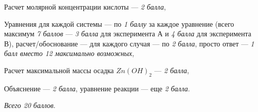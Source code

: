 \additionalCriteria

Расчет молярной концентрации кислоты — \textit{2 балла},

Уравнения для каждой системы — по \textit{1 баллу} за каждое уравнение (всего максимум \textit{7 баллов} — \textit{3 балла} для эксперимента А и \textit{4 балла} для эксперимента В), расчет/обоснование — для каждого случая — по \textit{2 балла}, просто ответ — \textit{1 балл вместо 12 максимально возможных},

Расчет максимальной массы осадка $Zn(OH)_2$ — \textit{2 балла},

Объяснение — \textit{2 балла}, уравнение реакции — еще \textit{2 балла}.

\textit{Всего 20 баллов}.